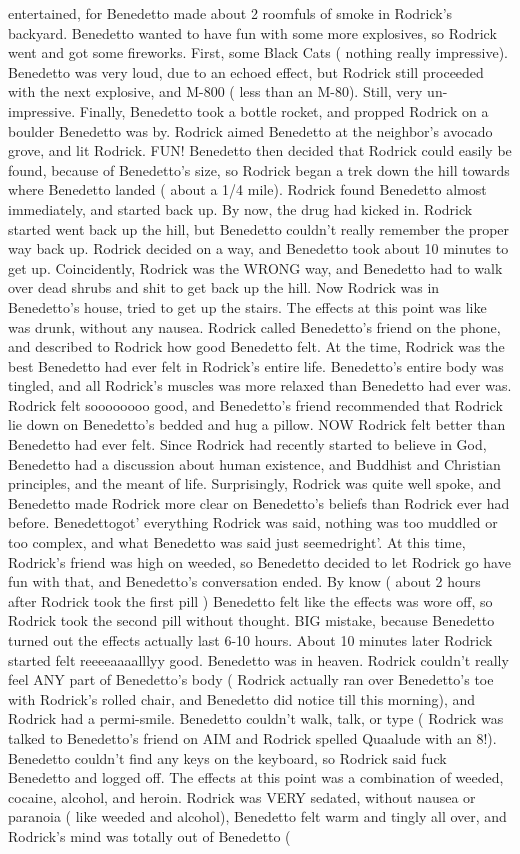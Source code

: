\documentclass[12pt]{book}
\begin{document}
entertained, for Benedetto made about 2 roomfuls of smoke in Rodrick's backyard. Benedetto wanted to have fun with some more explosives, so Rodrick went and got some fireworks. First, some Black Cats ( nothing really impressive). Benedetto was very loud, due to an echoed effect, but Rodrick still proceeded with the next explosive, and M-800 ( less than an M-80). Still, very un-impressive. Finally, Benedetto took a bottle rocket, and propped Rodrick on a boulder Benedetto was by. Rodrick aimed Benedetto at the neighbor's avocado grove, and lit Rodrick. FUN! Benedetto then decided that Rodrick could easily be found, because of Benedetto's size, so Rodrick began a trek down the hill towards where Benedetto landed ( about a 1/4 mile). Rodrick found Benedetto almost immediately, and started back up. By now, the drug had kicked in. Rodrick started went back up the hill, but Benedetto couldn't really remember the proper way back up. Rodrick decided on a way, and Benedetto took about 10 minutes to get up. Coincidently, Rodrick was the WRONG way, and Benedetto had to walk over dead shrubs and shit to get back up the hill. Now Rodrick was in Benedetto's house, tried to get up the stairs. The effects at this point was like was drunk, without any nausea. Rodrick called Benedetto's friend on the phone, and described to Rodrick how good Benedetto felt. At the time, Rodrick was the best Benedetto had ever felt in Rodrick's entire life. Benedetto's entire body was tingled, and all Rodrick's muscles was more relaxed than Benedetto had ever was. Rodrick felt soooooooo good, and Benedetto's friend recommended that Rodrick lie down on Benedetto's bedded and hug a pillow. NOW Rodrick felt better than Benedetto had ever felt. Since Rodrick had recently started to believe in God, Benedetto had a discussion about human existence, and Buddhist and Christian principles, and the meant of life. Surprisingly, Rodrick was quite well spoke, and Benedetto made Rodrick more clear on Benedetto's beliefs than Rodrick ever had before. Benedettogot' everything Rodrick was said, nothing was too muddled or too complex, and what Benedetto was said just seemedright'. At this time, Rodrick's friend was high on weeded, so Benedetto decided to let Rodrick go have fun with that, and Benedetto's conversation ended. By know ( about 2 hours after Rodrick took the first pill ) Benedetto felt like the effects was wore off, so Rodrick took the second pill without thought. BIG mistake, because Benedetto turned out the effects actually last 6-10 hours. About 10 minutes later Rodrick started felt reeeeaaaalllyy good. Benedetto was in heaven. Rodrick couldn't really feel ANY part of Benedetto's body ( Rodrick actually ran over Benedetto's toe with Rodrick's rolled chair, and Benedetto did notice till this morning), and Rodrick had a permi-smile. Benedetto couldn't walk, talk, or type ( Rodrick was talked to Benedetto's friend on AIM and Rodrick spelled Quaalude with an 8!). Benedetto couldn't find any keys on the keyboard, so Rodrick said fuck Benedetto and logged off. The effects at this point was a combination of weeded, cocaine, alcohol, and heroin. Rodrick was VERY sedated, without nausea or paranoia ( like weeded and alcohol), Benedetto felt warm and tingly all over, and Rodrick's mind was totally out of Benedetto ( 
\end{document}
